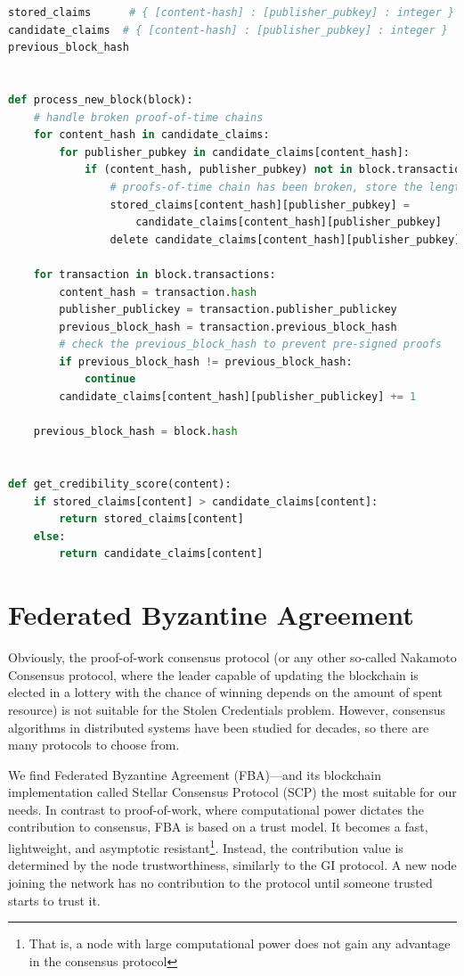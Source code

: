 \begin{lstlisting}[language=Python, caption=Processing a new block, label=listing_process_new_block,float,floatplacement=H]
stored_claims      # { [content-hash] : [publisher_pubkey] : integer }
candidate_claims  # { [content-hash] : [publisher_pubkey] : integer }
previous_block_hash


def process_new_block(block):
    # handle broken proof-of-time chains
    for content_hash in candidate_claims:
        for publisher_pubkey in candidate_claims[content_hash]:
            if (content_hash, publisher_pubkey) not in block.transactions:
                # proofs-of-time chain has been broken, store the length
                stored_claims[content_hash][publisher_pubkey] = 
                    candidate_claims[content_hash][publisher_pubkey]
                delete candidate_claims[content_hash][publisher_pubkey]

    for transaction in block.transactions:
        content_hash = transaction.hash
        publisher_publickey = transaction.publisher_publickey
        previous_block_hash = transaction.previous_block_hash
        # check the previous_block_hash to prevent pre-signed proofs
        if previous_block_hash != previous_block_hash:
            continue
        candidate_claims[content_hash][publisher_publickey] += 1

    previous_block_hash = block.hash


def get_credibility_score(content):
    if stored_claims[content] > candidate_claims[content]:
        return stored_claims[content]
    else:
        return candidate_claims[content]

\end{lstlisting}




\section{Federated Byzantine Agreement}
\label{FBA}
Obviously, the proof-of-work consensus protocol (or any other so-called Nakamoto Consensus protocol, where the leader capable of updating the blockchain is elected in a lottery with the chance of winning depends on the amount of spent resource) is not suitable for the Stolen Credentials problem. However, consensus algorithms in distributed systems have been studied for decades, so there are many protocols to choose from.

We find Federated Byzantine Agreement (FBA)––and its blockchain implementation called Stellar Consensus Protocol (SCP)\cite{mazieres2015stellar} the most suitable for our needs. In contrast to proof-of-work, where computational power dictates the contribution to consensus, FBA is based on a trust model. It becomes a fast, lightweight, and asymptotic resistant\footnote{That is, a node with large computational power does not gain any advantage in the consensus protocol}. Instead, the contribution value is determined by the node trustworthiness, similarly to the GI protocol. A new node joining the network has no contribution to the protocol until someone trusted starts to trust it.

